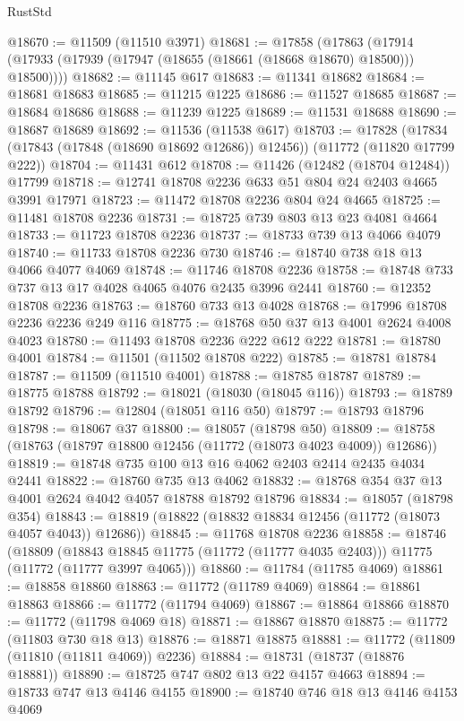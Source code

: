\begin{lexlean}{RustStd}
\begin{coremodule}
@18670 := @11509 (@11510 @3971)
@18681 := @17858
    (@17863 (@17914 (@17933 (@17939 (@17947 (@18655 (@18661 (@18668 @18670) @18500))) @18500))))
@18682 := @11145 @617
@18683 := @11341 @18682
@18684 := @18681 @18683
@18685 := @11215 @1225
@18686 := @11527 @18685
@18687 := @18684 @18686
@18688 := @11239 @1225
@18689 := @11531 @18688
@18690 := @18687 @18689
@18692 := @11536 (@11538 @617)
@18703 := @17828
    (@17834 (@17843 (@17848 (@18690 @18692 @12686)) @12456))
    (@11772 (@11820 @17799 @222))
@18704 := @11431 @612
@18708 := @11426 (@12482 (@18704 @12484)) @17799
@18718 := @12741 @18708 @2236 @633 @51 @804 @24 @2403 @4665 @3991 @17971
@18723 := @11472 @18708 @2236 @804 @24 @4665
@18725 := @11481 @18708 @2236
@18731 := @18725 @739 @803 @13 @23 @4081 @4664
@18733 := @11723 @18708 @2236
@18737 := @18733 @739 @13 @4066 @4079
@18740 := @11733 @18708 @2236 @730
@18746 := @18740 @738 @18 @13 @4066 @4077 @4069
@18748 := @11746 @18708 @2236
@18758 := @18748 @733 @737 @13 @17 @4028 @4065 @4076 @2435 @3996 @2441
@18760 := @12352 @18708 @2236
@18763 := @18760 @733 @13 @4028
@18768 := @17996 @18708 @2236 @2236 @249 @116
@18775 := @18768 @50 @37 @13 @4001 @2624 @4008 @4023
@18780 := @11493 @18708 @2236 @222 @612 @222
@18781 := @18780 @4001
@18784 := @11501 (@11502 @18708 @222)
@18785 := @18781 @18784
@18787 := @11509 (@11510 @4001)
@18788 := @18785 @18787
@18789 := @18775 @18788
@18792 := @18021 (@18030 (@18045 @116))
@18793 := @18789 @18792
@18796 := @12804 (@18051 @116 @50)
@18797 := @18793 @18796
@18798 := @18067 @37
@18800 := @18057 (@18798 @50)
@18809 := @18758 (@18763 (@18797 @18800 @12456 (@11772 (@18073 @4023 @4009)) @12686))
@18819 := @18748 @735 @100 @13 @16 @4062 @2403 @2414 @2435 @4034 @2441
@18822 := @18760 @735 @13 @4062
@18832 := @18768 @354 @37 @13 @4001 @2624 @4042 @4057 @18788 @18792 @18796
@18834 := @18057 (@18798 @354)
@18843 := @18819 (@18822 (@18832 @18834 @12456 (@11772 (@18073 @4057 @4043)) @12686))
@18845 := @11768 @18708 @2236
@18858 := @18746
    (@18809
      (@18843 @18845 @11775 (@11772 (@11777 @4035 @2403)))
      @11775
      (@11772 (@11777 @3997 @4065)))
@18860 := @11784 (@11785 @4069)
@18861 := @18858 @18860
@18863 := @11772 (@11789 @4069)
@18864 := @18861 @18863
@18866 := @11772 (@11794 @4069)
@18867 := @18864 @18866
@18870 := @11772 (@11798 @4069 @18)
@18871 := @18867 @18870
@18875 := @11772 (@11803 @730 @18 @13)
@18876 := @18871 @18875
@18881 := @11772 (@11809 (@11810 (@11811 @4069)) @2236)
@18884 := @18731 (@18737 (@18876 @18881))
@18890 := @18725 @747 @802 @13 @22 @4157 @4663
@18894 := @18733 @747 @13 @4146 @4155
@18900 := @18740 @746 @18 @13 @4146 @4153 @4069

\end{coremodule}
\end{lexlean}
